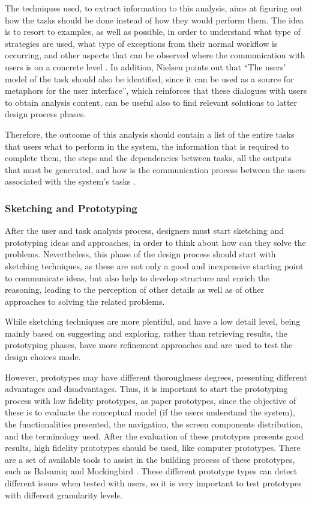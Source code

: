 The techniques used, to extract information to this analysis, aims at figuring out how the tasks should be done instead of how they would perform them. The idea is to resort to examples, as well as possible, in order to understand what type of strategies are used, what type of exceptions from their normal workflow is occurring, and other aspects that can be observed where the communication with users is on a concrete level \cite{usabilityEngineering}. In addition, Nielsen \cite{usabilityEngineering} points out that  “The users' model of the task should also be identified, since it can be used as a source for metaphors for the user interface”, which reinforces that these dialogues with users to obtain analysis content, can be useful also to find relevant solutions to latter design process phases.

Therefore, the outcome of this analysis should contain a list of the entire tasks that users what to perform in the system, the information that is required to complete them, the steps and the dependencies between tasks, all the outputs that must be generated, and how is the communication process between the users associated with the system’s tasks \cite{usabilityEngineering}.


\subsubsection{Sketching and Prototyping}
\label{subsubsec:sketching_and_prototyping}
After the user and task analysis process, designers must start sketching and prototyping ideas and approaches, in order to think about how can they solve the problems. Nevertheless, this phase of the design process should start with sketching techniques, as these are not only a good and inexpensive starting point to communicate ideas, but also help to develop structure and enrich the reasoning, leading to the perception of other details as well as of other approaches to solving the related problems.

While sketching techniques are more plentiful, and have a low detail level, being mainly based on suggesting and exploring, rather than retrieving results, the prototyping phases, have more refinement approaches and are used to test the design choices made.

However, prototypes may have different thoroughness degrees, presenting different advantages and disadvantages. Thus, it is important to start the prototyping process with low fidelity prototypes, as paper prototypes, since the objective of these is to evaluate the conceptual model (if the users understand the system), the functionalities presented, the navigation, the screen components distribution, and the terminology used. After the evaluation of these prototypes presents good results, high fidelity prototypes should be used, like computer prototypes. There are a set of available tools to assist in the building process of these prototypes, such as Balsamiq \cite{balsamiq} and Mockingbird \cite{mockingbird}. These different prototype types can detect different issues when tested with users, so it is very important to test prototypes with different granularity levels.

